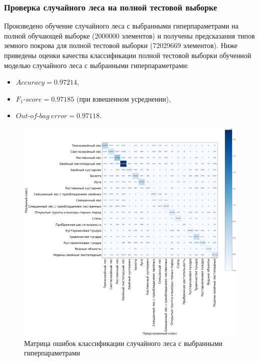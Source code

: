 \documentclass[14pt, a4paper, oneside]{extarticle}
\begin{document}
\subsubsection{Проверка случайного леса на полной тестовой выборке}
Произведено обучение случайного леса с выбранными гиперпараметрами на полной обучающей выборке (2000000 элементов) и получены предсказания типов земного покрова для полной тестовой выборки (72029669 элементов). Ниже приведены оценки качества классификации полной тестовой выборки обученной моделью случайного леса с выбранными гиперпараметрами:
\begin{itemize}
    \item[] $Accuracy = 0.97214,$
    \item[] $F_1\mbox{-}score = 0.97185$ (при взвешенном усреднении),
    \item[] $Out\mbox{-}of\mbox{-}bag\ error = 0.97118.$
\end{itemize}

\begin{figure}[H]
    \caption{Матрица ошибок классификации случайного леса с выбранными гиперпараметрами}
    \centering
    \includegraphics[scale=0.27]{confusion-matrix-3}
\end{figure}
\end{document}
